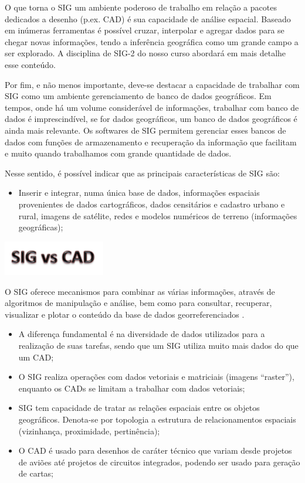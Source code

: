 \documentclass[
]{book}
\providecommand{\tightlist}{%
  \setlength{\itemsep}{0pt}\setlength{\parskip}{0pt}}
\begin{document}
O que torna o SIG um ambiente poderoso de trabalho em relação a pacotes dedicados a desenho (p.ex. CAD) é sua capacidade de análise espacial. Baseado em inúmeras ferramentas é possível cruzar, interpolar e agregar dados para se chegar novas informações, tendo a inferência geográfica como um grande campo a ser explorado. A disciplina de SIG-2 do nosso curso abordará em mais detalhe esse conteúdo.

Por fim, e não menos importante, deve-se destacar a capacidade de trabalhar com SIG como um ambiente gerenciamento de banco de dados geográficos. Em tempos, onde há um volume considerável de informações, trabalhar com banco de dados é imprescindível, se for dados geográficos, um banco de dados geográficos é ainda mais relevante. Os softwares de SIG permitem gerenciar esses bancos de dados com funções de armazenamento e recuperação da informação que facilitam e muito quando trabalhamos com grande quantidade de dados.

Nesse sentido, é possível indicar que as principais características de SIG são:

\begin{itemize}
\tightlist
\item
  Inserir e integrar, numa única base de dados, informações espaciais provenientes de dados cartográficos, dados censitários e cadastro urbano e rural, imagens de satélite, redes e modelos numéricos de terreno (informações geográficas);
\end{itemize}

\includegraphics[width=1.75in]{./images/sig_cad}

O SIG oferece mecanismos para combinar as várias informações, através de algoritmos de manipulação e análise, bem como para consultar, recuperar, visualizar e plotar o conteúdo da base de dados georreferenciados \citep{camaraqueiroz2001}.

\begin{itemize}
\item
  A diferença fundamental é na diversidade de dados utilizados para a realização de suas tarefas, sendo que um SIG utiliza muito mais dados do que um CAD;
\item
  O SIG realiza operações com dados vetoriais e matriciais (imagens ``raster''), enquanto os CADs se limitam a trabalhar com dados vetoriais;
\item
  SIG tem capacidade de tratar as relações espaciais entre os objetos geográficos. Denota-se por topologia a estrutura de relacionamentos espaciais (vizinhança, proximidade, pertinência);
\item
  O CAD é usado para desenhos de caráter técnico que variam desde projetos de aviões até projetos de circuitos integrados, podendo ser usado para geração de cartas;
\end{itemize}
\end{document}
